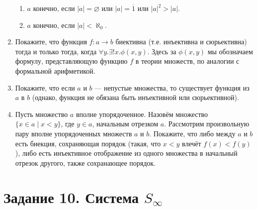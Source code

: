 \documentclass[10pt,a4paper,oneside]{article}
\begin{document}
\begin{enumerate}
\begin{enumerate}
\item $a$ конечно, если $|a|=\varnothing$ или $|a|=\overline{1}$ или $|a|^2 > |a|$.
\item $a$ конечно, если $|a|<\aleph_0$.
\end{enumerate}
\item Покажите, что функция $f: a \rightarrow b$ биективна (т.е. инъективна и сюрьективна) тогда и только тогда,
когда $\forall y.\exists!x.\phi(x,y)$. Здесь за $\phi(x,y)$ мы обозначаем формулу, представляющую функцию $f$
в теории множеств, по аналогии с формальной арифметикой.
\item Покажите, что если $a$ и $b$ --- непустые множества, то существует функция из $a$ в $b$ 
(однако, функция не обязана быть инъективной или сюрьективной).
\item Пусть множество $a$ вполне упорядоченное. Назовём множество $\{ x\in a \mid x < y\}$, где $y\in a$, начальным отрезком $a$. 
Рассмотрим произвольную пару вполне упорядоченных множеств $a$ и $b$.
Покажите, что либо между $a$ и $b$ есть биекция, сохраняющая порядок (такая, что $x < y$ влечёт $f(x) < f(y)$), либо есть инъективное отображение из одного множества в начальный отрезок другого, также сохранающее порядок.
\end{enumerate}

\section*{Задание 10. Система $S_\infty$}
\end{document}
